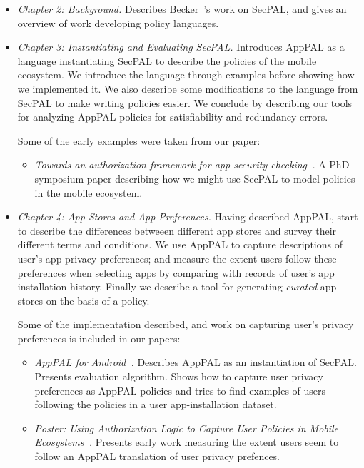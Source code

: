 \documentclass[thesis.tex]{subfiles}
\begin{document}
\begin{itemize}
\item \emph{Chapter 2: Background.} 
  Describes Becker~\etal's work on SecPAL, and gives an overview of work developing policy languages.

\item \emph{Chapter 3: Instantiating and Evaluating SecPAL.} 
  Introduces AppPAL as a language instantiating SecPAL to describe the policies
  of the mobile ecosystem. We introduce the language through examples before
  showing how we implemented it. We also describe some modifications to the
  language from SecPAL to make writing policies easier. We conclude by describing
  our tools for analyzing AppPAL policies for satisfiability and redundancy
  errors.
  
  Some of the early examples were taken from our paper:
  \begin{itemize}
  \item\emph{Towards an authorization framework for app security
      checking~\cite{hallett_towards_2014}.} A PhD symposium paper describing how
    we might use SecPAL to model policies in the mobile ecosystem.
  \end{itemize}

\item \emph{Chapter 4: App Stores and App Preferences.} 
  Having described AppPAL, start to describe the differences betweeen different
  app stores and survey their different terms and conditions. We use AppPAL to
  capture descriptions of user's app privacy preferences; and measure the extent
  users follow these preferences when selecting apps by comparing with records of
  user's app installation history. Finally we describe a tool for generating
  \emph{curated} app stores on the basis of a policy.
  
  Some of the implementation described, and work on capturing user's privacy preferences is included in our papers:
  \begin{itemize}
  \item\emph{AppPAL for Android~\cite{hallett_apppal_2016}.} Describes AppPAL as an instantiation of SecPAL.  Presents evaluation algorithm.  Shows how to capture user privacy preferences as AppPAL policies and tries to find examples of users following the policies in a user app-installation dataset.
  \item\emph{Poster: Using Authorization Logic to Capture User Policies in Mobile Ecosystems~\cite{hallett_poster:_2015}.}  Presents early work measuring the extent users seem to follow an AppPAL translation of user privacy prefences.
  \end{itemize}


\end{itemize}
\end{document}
